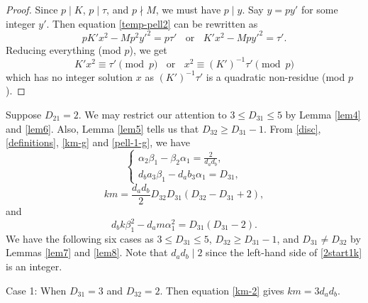 \documentclass[12pt]{article}
\begin{document}
\begin{proof}
Since $p \mid K$, $p \mid \tau$, and $p \nmid M$, we must have $p \mid y$. Say $y = p y'$ for some integer $y'$. Then equation \eqref{temp-pell2} can be rewritten as
\begin{equation*}
    p K'x^2-M p^2 y'^2=p \tau' \; \; \text{ or } \; \; K' x^2- M p y'^2=\tau'.
\end{equation*}
Reducing everything (mod $p$), we get 
\begin{equation*}
    K' x^2\equiv\tau' \pmod{p} \; \; \text{ or } \; \; x^2\equiv(K')^{-1} \tau' \pmod{p}
\end{equation*}
which has no integer solution $x$ as $(K')^{-1}\tau'$ is a quadratic non-residue (mod $p$).
\end{proof}

Suppose $D_{21} = 2$. We may restrict our attention to $3 \le D_{31} \le 5$ by Lemma \ref{lem4} and \ref{lem6}. Also, Lemma \ref{lem5} tells us that $D_{32} \ge D_{31} - 1$. From \eqref{disc}, \eqref{definitions}, \eqref{km-g} and \eqref{pell-1-g}, we have
\begin{equation} \label{2start1k}
\left\{ \begin{array}{l} \alpha_2 \beta_1 - \beta_2 \alpha_1 = \frac{2}{d_a d_b}, \\
d_b a_3 \beta_1 - d_a b_3 \alpha_1 = D_{31},
\end{array} \right.
\end{equation}
\begin{equation} \label{km-2}
k m = \frac{d_a d_b}{2}{D_{32} D_{31} (D_{32} - D_{31} + 2)},
\end{equation}
and
\begin{equation} \label{pell-1-2}
d_b k \beta_1^2 - d_a m \alpha_1^2 = D_{31} (D_{31} - 2).
\end{equation}
\noindent We have the following six cases as $3 \le D_{31} \le 5$, $D_{32} \ge D_{31} - 1$, and $D_{31} \neq D_{32}$ by Lemmas \ref{lem7} and \ref{lem8}. Note that $d_a d_b \mid 2$ since the left-hand side of \eqref{2start1k} is an integer.

\bigskip

Case 1: When $D_{31} = 3$ and $D_{32} = 2$. Then equation \eqref{km-2} gives $k m = 3 d_a d_b$.
\end{document}
